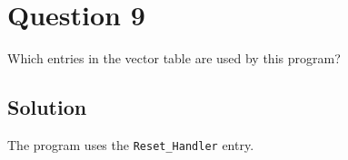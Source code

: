 \section*{Question 9}

Which entries in the vector table are used by this program?

\subsection*{Solution}

The program uses the \texttt{Reset\_Handler} entry.
